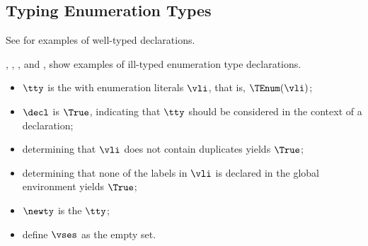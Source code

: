 \subsection{Typing Enumeration Types\label{sec:TypingEnumerationTypes}}
See  for examples of well-typed \enumerationtypesterm{}
declarations.

,
,
, and
,
show examples of ill-typed enumeration type declarations.

\ProseParagraph
\AllApply
\begin{itemize}
  \item $\tty$ is the \enumerationtypeterm{} with enumeration literals
        $\vli$, that is, $\TEnum(\vli)$;
  \item $\decl$ is $\True$, indicating that $\tty$ should be considered in the context of a declaration;
  \item determining that $\vli$ does not contain duplicates yields $\True$\ProseOrTypeError;
  \item determining that none of the labels in $\vli$ is declared in the global environment
  yields $\True$\ProseOrTypeError;
  \item $\newty$ is the \enumerationtypeterm{} $\tty$;
  \item define $\vses$ as the empty set.
\end{itemize}

\FormallyParagraph
\begin{mathpar}
\end{mathpar}


